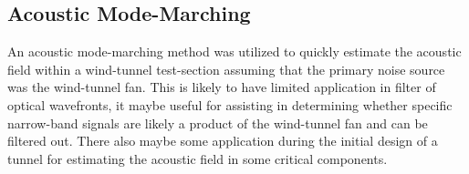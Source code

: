 \subsection{Acoustic Mode-Marching}
An acoustic mode-marching method was utilized to quickly estimate the acoustic field within a wind-tunnel test-section assuming that the primary noise source was the wind-tunnel fan.
This is likely to have limited application in filter of optical wavefronts, it maybe useful for assisting in determining whether specific narrow-band signals are likely a product of the wind-tunnel fan and can be filtered out.
There also maybe some application during the initial design of a tunnel for estimating the acoustic field in some critical components.
